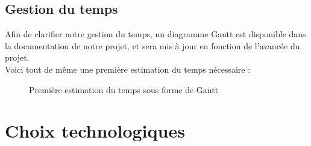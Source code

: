 \documentclass[a4paper]{article}
\newcommand{\alinea}{\hspace*{0.5cm}}
\begin{document}
      \subsection{Gestion du temps}
        \label{GestionTps}
        \alinea Afin de clarifier notre gestion du temps, un diagramme Gantt est disponible dans la documentation de notre projet, et sera mis à jour en fonction de l'avancée du projet.\\
        \alinea Voici tout de même une première estimation du temps nécessaire :
        \begin{figure}
          \begin{center}
          \end{center}
          \label{DiagGantt}
          \caption{Première estimation du temps sous forme de Gantt}
        \end{figure}

    \section{Choix technologiques}
\end{document}
